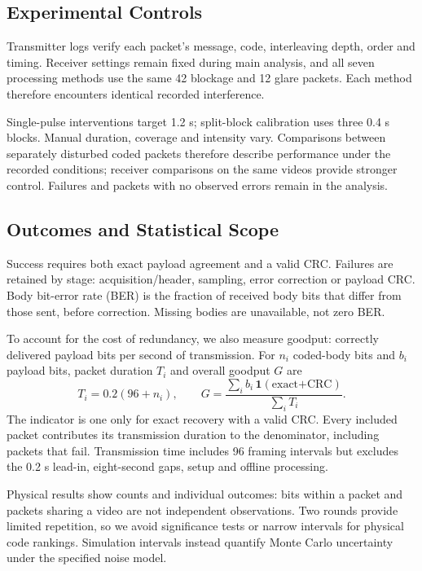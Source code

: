 \documentclass[conference,a4paper]{IEEEtran}
\begin{document}
\subsection{Experimental Controls}
Transmitter logs verify each packet's message, code, interleaving depth,
order and timing. Receiver settings remain fixed during main analysis,
and all seven processing methods use the same 42 blockage and 12 glare
packets. Each method therefore encounters identical recorded interference.

Single-pulse interventions target 1.2 s; split-block calibration uses three
0.4 s blocks. Manual duration, coverage and intensity vary. Comparisons between separately disturbed coded packets
therefore describe performance under the recorded conditions; receiver
comparisons on the same videos provide stronger control. Failures and
packets with no observed errors remain in the analysis.

\subsection{Outcomes and Statistical Scope}
Success requires both exact payload agreement and a valid CRC. Failures
are retained by stage: acquisition/header, sampling, error correction or
payload CRC. Body bit-error rate (BER) is the fraction of received body
bits that differ from those sent, before correction. Missing bodies are
unavailable, not zero BER.

To account for the cost of redundancy, we also measure goodput: correctly
delivered payload bits per second of transmission. For $n_i$ coded-body
bits and $b_i$ payload bits, packet duration $T_i$ and overall goodput $G$ are
\begin{equation}
T_i=0.2(96+n_i),\qquad
G=\frac{\sum_i b_i\,\mathbf{1}(\text{exact+CRC})}{\sum_i T_i}.
\end{equation}
The indicator is one only for exact recovery with a valid CRC. Every included packet contributes its transmission duration to the denominator, including packets that fail. Transmission time includes
96 framing intervals but excludes the 0.2 s lead-in, eight-second gaps,
setup and offline processing.

Physical results show counts and individual outcomes: bits within a
packet and packets sharing a video are not independent observations.
Two rounds provide limited repetition, so we avoid significance tests or
narrow intervals for physical code rankings. Simulation intervals instead
quantify Monte Carlo uncertainty under the specified noise model.
\end{document}

